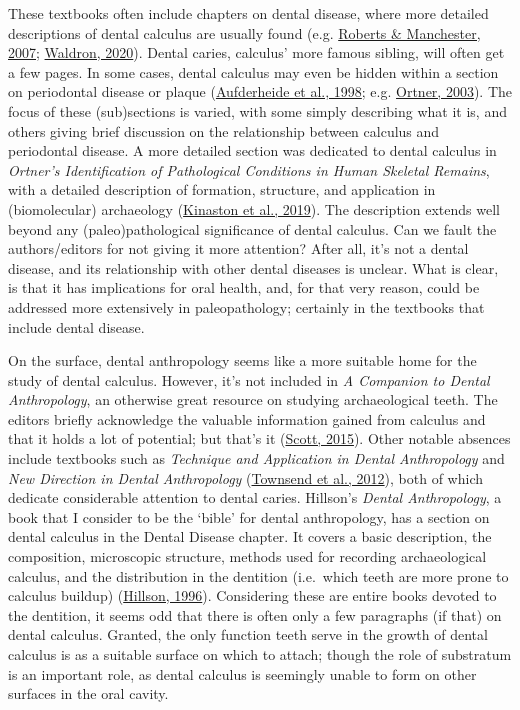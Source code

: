 \documentclass[
  b5paper,
]{book}
\begin{document}
These textbooks often include chapters on dental disease, where more
detailed descriptions of dental calculus are usually found (e.g.
\protect\hyperlink{ref-robertsDentalDisease2007}{Roberts \& Manchester,
2007}; \protect\hyperlink{ref-waldronPalaeopathology2020}{Waldron,
2020}). Dental caries, calculus' more famous sibling, will often get a
few pages. In some cases, dental calculus may even be hidden within a
section on periodontal disease or plaque
(\protect\hyperlink{ref-aufderheidePaleopathology1998}{Aufderheide et
al., 1998}; e.g.
\protect\hyperlink{ref-ortnerIdentificationPathological2003}{Ortner,
2003}). The focus of these (sub)sections is varied, with some simply
describing what it is, and others giving brief discussion on the
relationship between calculus and periodontal disease. A more detailed
section was dedicated to dental calculus in \emph{Ortner's
Identification of Pathological Conditions in Human Skeletal Remains},
with a detailed description of formation, structure, and application in
(biomolecular) archaeology
(\protect\hyperlink{ref-kinastonOrtnerDentition2019}{Kinaston et al.,
2019}). The description extends well beyond any (paleo)pathological
significance of dental calculus. Can we fault the authors/editors for
not giving it more attention? After all, it's not a dental disease, and
its relationship with other dental diseases is unclear. What is clear,
is that it has implications for oral health, and, for that very reason,
could be addressed more extensively in paleopathology; certainly in the
textbooks that include dental disease.

On the surface, dental anthropology seems like a more suitable home for
the study of dental calculus. However, it's not included in \emph{A
Companion to Dental Anthropology}, an otherwise great resource on
studying archaeological teeth. The editors briefly acknowledge the
valuable information gained from calculus and that it holds a lot of
potential; but that's it
(\protect\hyperlink{ref-scottBriefHistory2015}{Scott, 2015}). Other
notable absences include textbooks such as \emph{Technique and
Application in Dental Anthropology} and \emph{New Direction in Dental
Anthropology}
(\protect\hyperlink{ref-townsendDentalAnthropology2012}{Townsend et al.,
2012}), both of which dedicate considerable attention to dental caries.
Hillson's \emph{Dental Anthropology}, a book that I consider to be the
`bible' for dental anthropology, has a section on dental calculus in the
Dental Disease chapter. It covers a basic description, the composition,
microscopic structure, methods used for recording archaeological
calculus, and the distribution in the dentition (i.e.~which teeth are
more prone to calculus buildup)
(\protect\hyperlink{ref-hillsonDentalAnthropology1996}{Hillson, 1996}).
Considering these are entire books devoted to the dentition, it seems
odd that there is often only a few paragraphs (if that) on dental
calculus. Granted, the only function teeth serve in the growth of dental
calculus is as a suitable surface on which to attach; though the role of
substratum is an important role, as dental calculus is seemingly unable
to form on other surfaces in the oral cavity.
\end{document}
